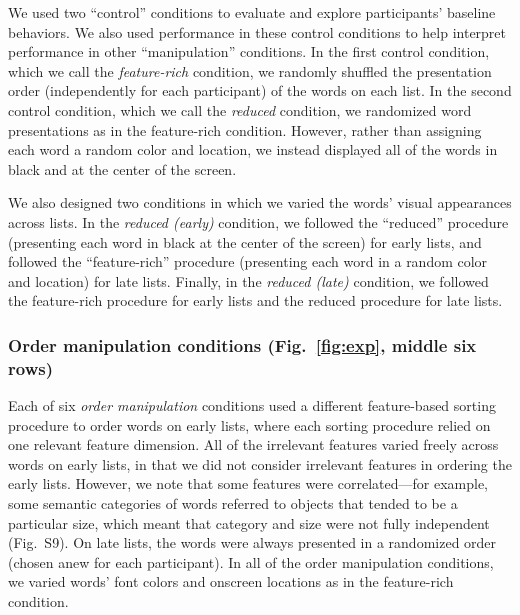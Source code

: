 \documentclass[11pt]{article}
\newcommand{\featureCorrs}{S9}
\begin{document}
We used two ``control'' conditions to evaluate and explore participants'
baseline behaviors. We also used performance in these control conditions to
help interpret performance in other ``manipulation'' conditions. In the first
control condition, which we call the \textit{feature-rich} condition, we
randomly shuffled the presentation order (independently for each participant)
of the words on each list. In the second control condition, which we call the
\textit{reduced} condition, we randomized word presentations as in the
feature-rich condition. However, rather than assigning each word a random color
and location, we instead displayed all of the words in black and at the center
of the screen.

We also designed two conditions in which we varied the words' visual
appearances across lists. In the \textit{reduced (early)} condition, we
followed the ``reduced'' procedure (presenting each word in black at the center
of the screen) for early lists, and followed the ``feature-rich'' procedure
(presenting each word in a random color and location) for late lists. Finally,
in the \textit{reduced (late)} condition, we followed the feature-rich
procedure for early lists and the reduced procedure for late lists.

\subsubsection*{Order manipulation conditions (Fig.~\ref{fig:exp}, middle six
rows)}

Each of six \textit{order manipulation} conditions used a different
feature-based sorting procedure to order words on early lists, where each
sorting procedure relied on one relevant feature dimension. All of the
irrelevant features varied freely across words on early lists, in that we did
not consider irrelevant features in ordering the early lists. However, we note
that some features were correlated---for example, some semantic categories of
words referred to objects that tended to be a particular size, which meant that
category and size were not fully independent (Fig.~\featureCorrs). On late
lists, the words were always presented in a randomized order (chosen anew for
each participant). In all of the order manipulation conditions, we varied
words' font colors and onscreen locations as in the feature-rich condition.
\end{document}
